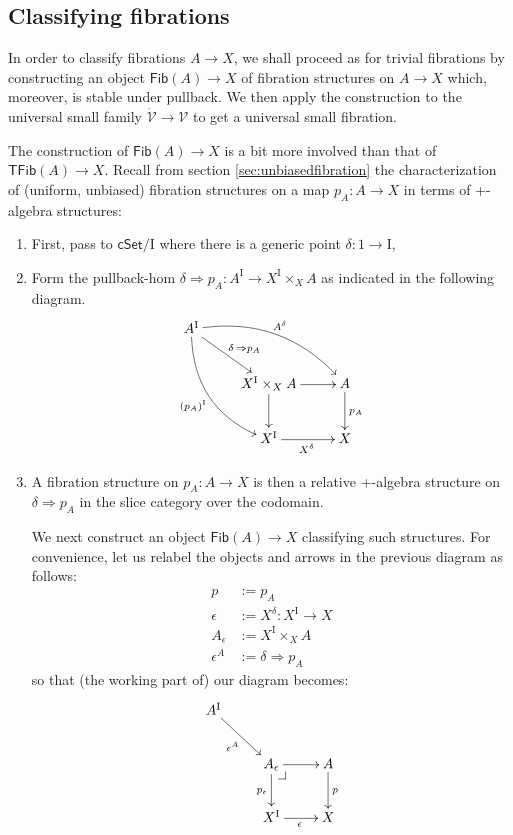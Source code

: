 \documentclass[11pt]{article}
\makeatletter
\newcommand{\cSet}{\ensuremath{\mathsf{cSet}}}
\newcommand{\pbcorner}[1][dr]{\save*!/#1-1.2pc/#1:(-1,1)@^{|-}\restore}
\newcommand{\ra}{\ensuremath{\rightarrow}}
\newcommand{\I}{\ensuremath{\mathrm{I}}}
\newcommand{\V}{\ensuremath{\mathcal{V}}}
\newcommand{\VV}{\ensuremath{\dot{\mathcal{V}}}}
\newcommand{\Fib}{\ensuremath{\mathsf{Fib}}}
\newcommand{\TFib}{\ensuremath{\mathsf{TFib}}}
\theoremstyle{remark}
\theoremstyle{definition}
\makeatother
\begin{document}
\subsection{Classifying fibrations}

In order to classify fibrations $A\ra X$, we shall proceed as for trivial fibrations by constructing an object $\Fib(A)\ra X$ of fibration structures on $A\ra X$ which, moreover, is stable under pullback.  We then apply the construction to the universal small family $\VV\ra\V$ to get a universal small fibration.  

The construction of $\Fib(A)\ra X$ is a bit more involved than that of $\TFib(A)\ra X$.  Recall from section \ref{sec:unbiasedfibration} the characterization of (uniform, unbiased) fibration structures on a map $p_A : A\ra X$ in terms of +-algebra structures:  
\begin{enumerate}
\item First, pass to $\cSet/\I$ where there is a generic point $\delta : 1 \ra \I$,

\item Form the pullback-hom $\delta\Rightarrow p_A : A^\I \ra X^\I \times_X A$ as indicated in the following diagram.
\begin{equation}\label{diagram:fibU1}
\xymatrix{
A^\I \ar@/_4ex/ [rdd]_{(p_A)^\I} \ar[rd]^{\delta\, \Rightarrow p_A} \ar@/^4ex/ [rrd]^{A^\delta} && \\
& X^\I \times_{X} A \ar[d] \ar[r] & A \ar[d]^{p_A} \\
& X^\I \ar[r]_{X^\delta} &  X 
}
\end{equation}

\item A fibration structure on $p_A : A\ra X$ is then a relative +-algebra structure on $\delta\Rightarrow p_A$ in the slice category over the codomain. 

We next construct an object $\Fib(A)\ra X$ classifying such structures.
For convenience, let us relabel the objects and arrows in the previous diagram as follows:
\begin{align*}
p &:= p_A\\
\epsilon &:= X^\delta : X^\I \ra X \\
A_\epsilon &:= X^\I \times_X A\\
\epsilon^A &:= \delta\Rightarrow p_A
\end{align*}
so that (the working part of) our diagram becomes:
\begin{equation}\label{diagram:fibU2}
\xymatrix{
A^\I \ar[rd]_{\epsilon^A} && \\
& A_\epsilon\ar[d]_{p_\epsilon} \ar[r] \pbcorner & A \ar[d]^{p} \\
& X^\I \ar[r]_{\epsilon} &  X 
}
\end{equation}


\end{enumerate}
\end{document}
